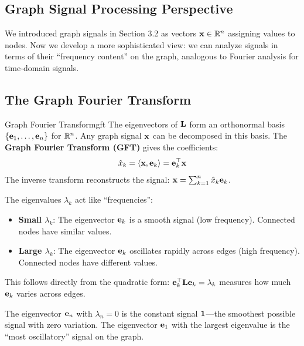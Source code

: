 \begin{notechapter}
\section{Graph Signal Processing Perspective}

We introduced graph signals in Section 3.2 as vectors $\mathbf{x} \in \mathbb{R}^n$ assigning values to nodes. Now we develop a more sophisticated view: we can analyze signals in terms of their ``frequency content'' on the graph, analogous to Fourier analysis for time-domain signals.

\subsection{The Graph Fourier Transform}

\begin{definition}{Graph Fourier Transform}{gft}
The eigenvectors of $\mathbf{L}$ form an orthonormal basis $\{\mathbf{e}_1, \ldots, \mathbf{e}_n\}$ for $\mathbb{R}^n$. Any graph signal $\mathbf{x}$ can be decomposed in this basis. The \textbf{Graph Fourier Transform (GFT)} gives the coefficients:
\begin{equation}
\hat{x}_k = \langle \mathbf{x}, \mathbf{e}_k \rangle = \mathbf{e}_k^\top \mathbf{x}
\end{equation}
The inverse transform reconstructs the signal: $\mathbf{x} = \sum_{k=1}^{n} \hat{x}_k \mathbf{e}_k$.
\end{definition}

\begin{intuition}
The eigenvalues $\lambda_k$ act like ``frequencies'':
\begin{itemize}
    \item \textbf{Small $\lambda_k$}: The eigenvector $\mathbf{e}_k$ is a smooth signal (low frequency). Connected nodes have similar values.
    \item \textbf{Large $\lambda_k$}: The eigenvector $\mathbf{e}_k$ oscillates rapidly across edges (high frequency). Connected nodes have different values.
\end{itemize}
This follows directly from the quadratic form: $\mathbf{e}_k^\top \mathbf{L} \mathbf{e}_k = \lambda_k$ measures how much $\mathbf{e}_k$ varies across edges.

The eigenvector $\mathbf{e}_n$ with $\lambda_n = 0$ is the constant signal $\mathbf{1}$---the smoothest possible signal with zero variation. The eigenvector $\mathbf{e}_1$ with the largest eigenvalue is the ``most oscillatory'' signal on the graph.
\end{intuition}


\end{notechapter}
